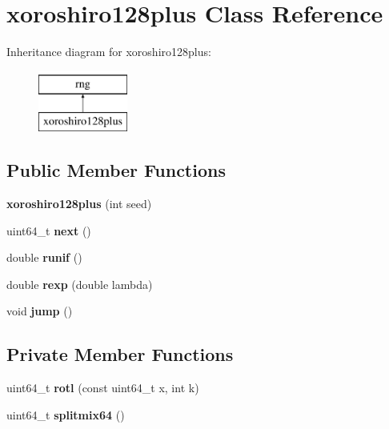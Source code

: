 \hypertarget{classxoroshiro128plus}{}\section{xoroshiro128plus Class Reference}
\label{classxoroshiro128plus}
Inheritance diagram for xoroshiro128plus\+:\begin{figure}[H]
\begin{center}
\leavevmode
\includegraphics[height=2.000000cm]{classxoroshiro128plus}
\end{center}
\end{figure}
\subsection*{Public Member Functions}
\begin{DoxyCompactItemize}
\item 
\mbox{\label{classxoroshiro128plus_ae32867bf0900c675d3b6f638ea2c49e1}} 
{\bfseries xoroshiro128plus} (int seed)
\item 
\mbox{\label{classxoroshiro128plus_a14185bcb657d561663803f4a8b2e9a92}} 
uint64\+\_\+t {\bfseries next} ()
\item 
\mbox{\label{classxoroshiro128plus_a5054e4de9c05fdab89ab41dbfe05a424}} 
double {\bfseries runif} ()
\item 
\mbox{\label{classxoroshiro128plus_a6446e4eb6a60a0a454e8722ce450dda9}} 
double {\bfseries rexp} (double lambda)
\item 
\mbox{\label{classxoroshiro128plus_a8058dee37dfc67409ed8674ba8f830a9}} 
void {\bfseries jump} ()
\end{DoxyCompactItemize}
\subsection*{Private Member Functions}
\begin{DoxyCompactItemize}
\item 
\mbox{\label{classxoroshiro128plus_ac80afbdcbf2c512310c4aebe42f936f0}} 
uint64\+\_\+t {\bfseries rotl} (const uint64\+\_\+t x, int k)
\item 
\mbox{\label{classxoroshiro128plus_aee8ea766a36b82e20c5fdc2c5184a41c}} 
uint64\+\_\+t {\bfseries splitmix64} ()
\end{DoxyCompactItemize}
